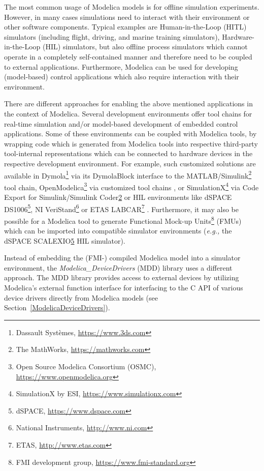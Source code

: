 \documentclass{resources/modelica}
\begin{document}
The most common usage of Modelica models is for offline simulation experiments.
However, in many cases simulations need to interact with their environment or
other software components.
Typical examples are Human-in-the-Loop (HITL) simulators (including flight,
driving, and marine training simulators), Hardware-in-the-Loop (HIL) simulators,
but also offline process simulators which cannot operate in a completely
self-contained manner and therefore need to be coupled to external applications.
Furthermore, Modelica can be used for developing (model-based) control
applications which also require interaction with their environment.

There are different approaches for enabling the above mentioned applications in
the context of Modelica. Several development environments offer tool chains for
real-time simulation and/or model-based development of embedded control
applications.
Some of these environments can be coupled with Modelica tools, by wrapping code
which is generated from Modelica tools into respective third-party tool-internal
representations which can be connected to hardware devices in the respective
development environment. For example,
such customized solutions are available in
Dymola\footnote{Dassault Systèmes,
\url{https://www.3ds.com}} via its DymolaBlock interface to the
MATLAB/Simulink\footnote{\label{tmw}The MathWorks, \url{https://mathworks.com}}
tool chain, OpenModelica\footnote{Open Source Modelica Consortium (OSMC),
\url{https://www.openmodelica.org}} via customized tool chains
\citep{Worschech2012}, or SimulationX\footnote{SimulationX by ESI,
\url{https://www.simulationx.com}} via Code Export for Simulink/Simulink
Coder\cref{tmw} or HIL environments like dSPACE
DS1006\footnote{\label{dspace}dSPACE, \url{https://www.dspace.com}}, NI
VeriStand\footnote{National Instruments, \url{http://www.ni.com}} or ETAS
LABCAR\footnote{ETAS, \url{http://www.etas.com}} \citep{Blochwitz2009}.
Furthermore, it may also be possible for a Modelica tool to generate Functional
Mock-up Units\footnote{FMI development group,
\url{https://www.fmi-standard.org}} (FMUs) which can be imported into compatible
simulator environments (\textit{e.g.,} the dSPACE SCALEXIO\cref{dspace} HIL simulator).

Instead of embedding the (FMI-) compiled Modelica model into a simulator
environment, the \emph{Modelica\_DeviceDrivers} (MDD) library uses a different approach.
The MDD library provides access to external devices by utilizing Modelica's external
function interface for interfacing to the C API of various device drivers directly from Modelica
models (see Section~\ref{ModelicaDeviceDrivers}).
\end{document}
